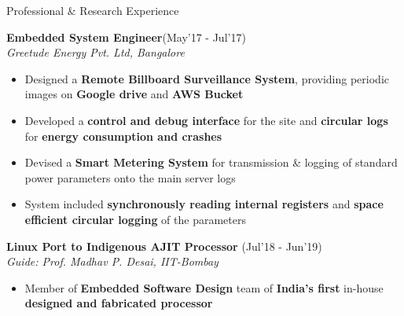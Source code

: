 \documentclass{resume}
\newcommand{\sepval}{-0.5em}
\begin{document}
\begin{rSection}{Professional \& Research Experience}

\vspace{-.4cm}
 
\item{\bf {\bf Embedded System Engineer}}\hfill{(May'17 - Jul'17)}\\ \emph{Greetude Energy Pvt. Ltd, Bangalore}\\
[-0.4cm]
  
\begin{itemize}[leftmargin=*]
    
	\itemsep \sepval
 
	
	\item Designed a {\bf Remote Billboard Surveillance System}, providing periodic images on {\bf Google drive} and {\bf AWS Bucket}
	 
	\item Developed a {\bf control and debug interface} for the site and {\bf circular logs} for {\bf energy consumption and crashes}

	\item Devised a {\bf Smart Metering System} for transmission \& logging of standard power parameters onto the main server logs
 
	\item System included {\bf synchronously reading internal registers} and {\bf space efficient circular logging} of the parameters
	      
 
\end{itemize}

\vspace{-0.1cm}
\item {\bf{Linux Port to Indigenous AJIT Processor}} \hfill {(Jul'18 - Jun'19)}\\

\emph{Guide: Prof. Madhav P. Desai, IIT-Bombay}\\
[-0.6cm]

\begin{itemize}[leftmargin=*]
		
	\itemsep \sepval

	\item Member of {\bf Embedded Software Design} team of {\bf India's first} in-house {\bf designed and fabricated processor}
	

\end{itemize}
\end{rSection}
\end{document}
